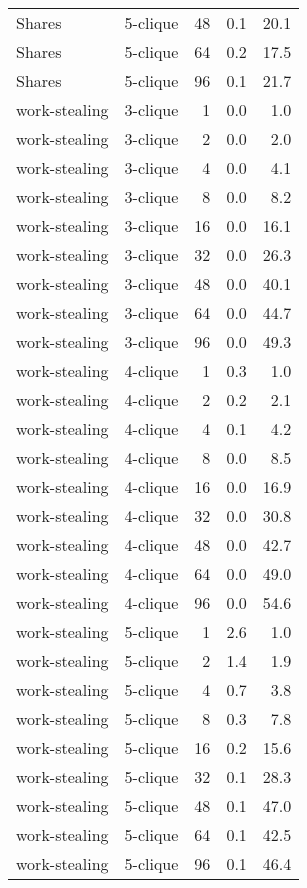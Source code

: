 \begin{tabular}{llr|rr}
        Shares &  5-clique &           48 &   0.1 &     20.1 \\
        Shares &  5-clique &           64 &   0.2 &     17.5 \\
        Shares &  5-clique &           96 &   0.1 &     21.7 \\
 work-stealing &  3-clique &            1 &   0.0 &      1.0 \\
 work-stealing &  3-clique &            2 &   0.0 &      2.0 \\
 work-stealing &  3-clique &            4 &   0.0 &      4.1 \\
 work-stealing &  3-clique &            8 &   0.0 &      8.2 \\
 work-stealing &  3-clique &           16 &   0.0 &     16.1 \\
 work-stealing &  3-clique &           32 &   0.0 &     26.3 \\
 work-stealing &  3-clique &           48 &   0.0 &     40.1 \\
 work-stealing &  3-clique &           64 &   0.0 &     44.7 \\
 work-stealing &  3-clique &           96 &   0.0 &     49.3 \\
 work-stealing &  4-clique &            1 &   0.3 &      1.0 \\
 work-stealing &  4-clique &            2 &   0.2 &      2.1 \\
 work-stealing &  4-clique &            4 &   0.1 &      4.2 \\
 work-stealing &  4-clique &            8 &   0.0 &      8.5 \\
 work-stealing &  4-clique &           16 &   0.0 &     16.9 \\
 work-stealing &  4-clique &           32 &   0.0 &     30.8 \\
 work-stealing &  4-clique &           48 &   0.0 &     42.7 \\
 work-stealing &  4-clique &           64 &   0.0 &     49.0 \\
 work-stealing &  4-clique &           96 &   0.0 &     54.6 \\
 work-stealing &  5-clique &            1 &   2.6 &      1.0 \\
 work-stealing &  5-clique &            2 &   1.4 &      1.9 \\
 work-stealing &  5-clique &            4 &   0.7 &      3.8 \\
 work-stealing &  5-clique &            8 &   0.3 &      7.8 \\
 work-stealing &  5-clique &           16 &   0.2 &     15.6 \\
 work-stealing &  5-clique &           32 &   0.1 &     28.3 \\
 work-stealing &  5-clique &           48 &   0.1 &     47.0 \\
 work-stealing &  5-clique &           64 &   0.1 &     42.5 \\
 work-stealing &  5-clique &           96 &   0.1 &     46.4 \\
\bottomrule
\end{tabular}
